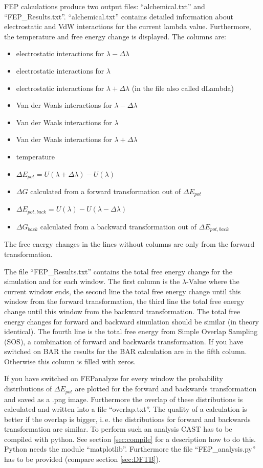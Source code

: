 \documentclass[10pt,a4paper]{article} %
\begin{document}
	\ac{FEP} calculations produce two output files: ``alchemical.txt'' and ``FEP\_Results.txt''. ``alchemical.txt'' contains detailed information about electrostatic and \ac{VdW} interactions for the current lambda value. Furthermore, the temperature and free energy change is displayed. The columns are:
	\begin{itemize}
	\item electrostatic interactions for $\lambda - \Delta \lambda$
	\item electrostatic interactions for $\lambda$
	\item electrostatic interactions for $\lambda + \Delta \lambda$ (in the file also called dLambda)
	\item Van der Waals interactions for $\lambda - \Delta \lambda$
	\item Van der Waals interactions for $\lambda$
	\item Van der Waals interactions for $\lambda + \Delta \lambda$ 
	\item temperature
	\item $\Delta E_{pot} = U(\lambda + \Delta \lambda) - U(\lambda)$
	\item $\Delta G$ calculated from a forward transformation out of $\Delta E_{pot}$
	\item $\Delta E_{pot, back} = U(\lambda) - U(\lambda - \Delta \lambda)$
	\item $\Delta G_{back}$ calculated from a backward transformation out of $\Delta E_{pot,back}$
	\end{itemize}
	The free energy changes in the lines without columns are only from the forward transformation.
	
	The file ``FEP\_Results.txt'' contains the total free energy change for the simulation and for each window. The first column is the $\lambda$-Value where the current window ends, the second line the total free energy change until this window from the forward transformation, the third line the total free energy change until this window from the backward transformation. The total free energy changes for forward and backward simulation should be similar (in theory identical). The fourth line is the total free energy from Simple Overlap Sampling (SOS), a combination of forward and backwards transformation. If you have switched on BAR the results for the BAR calculation are in the fifth column. Otherwise this column is filled with zeros.
	
	If you have switched on FEPanalyze for every window the probability distributions of $\Delta E_{pot}$ are plotted for the forward and backwards transformation and saved as a .png image. Furthermore the overlap of these distributions is calculated and written into a file ``overlap.txt''. The quality of a calculation is better if the overlap is bigger, i.\,e. the distributions for forward and backwards transformation are similar. To perform such an analysis CAST has to be compiled with python. See section \ref{sec:compile} for a description how to do this. Python needs the module ``matplotlib''. Furthermore the file ``FEP\_analysis.py'' has to be provided (compare section \ref{sec:DFTB}). 
	
\end{document}
